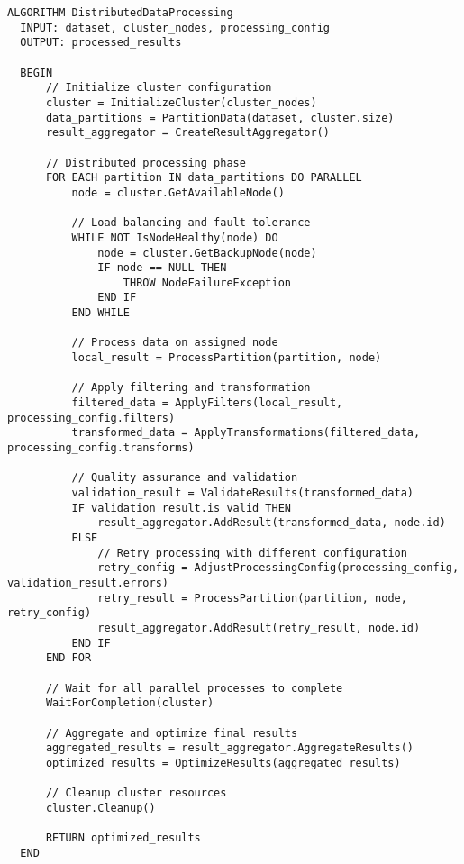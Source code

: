 \begin{lstlisting}[caption=Contoh algoritma paralel]
  ALGORITHM DistributedDataProcessing
  INPUT: dataset, cluster_nodes, processing_config
  OUTPUT: processed_results
  
  BEGIN
      // Initialize cluster configuration
      cluster = InitializeCluster(cluster_nodes)
      data_partitions = PartitionData(dataset, cluster.size)
      result_aggregator = CreateResultAggregator()
      
      // Distributed processing phase
      FOR EACH partition IN data_partitions DO PARALLEL
          node = cluster.GetAvailableNode()
          
          // Load balancing and fault tolerance
          WHILE NOT IsNodeHealthy(node) DO
              node = cluster.GetBackupNode(node)
              IF node == NULL THEN
                  THROW NodeFailureException
              END IF
          END WHILE
          
          // Process data on assigned node
          local_result = ProcessPartition(partition, node)
          
          // Apply filtering and transformation
          filtered_data = ApplyFilters(local_result, processing_config.filters)
          transformed_data = ApplyTransformations(filtered_data, processing_config.transforms)
          
          // Quality assurance and validation
          validation_result = ValidateResults(transformed_data)
          IF validation_result.is_valid THEN
              result_aggregator.AddResult(transformed_data, node.id)
          ELSE
              // Retry processing with different configuration
              retry_config = AdjustProcessingConfig(processing_config, validation_result.errors)
              retry_result = ProcessPartition(partition, node, retry_config)
              result_aggregator.AddResult(retry_result, node.id)
          END IF
      END FOR
      
      // Wait for all parallel processes to complete
      WaitForCompletion(cluster)
      
      // Aggregate and optimize final results
      aggregated_results = result_aggregator.AggregateResults()
      optimized_results = OptimizeResults(aggregated_results)
      
      // Cleanup cluster resources
      cluster.Cleanup()
      
      RETURN optimized_results
  END
\end{lstlisting}